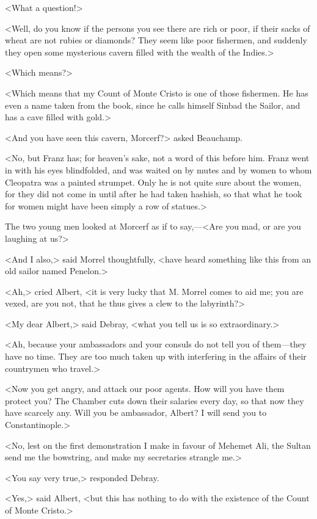  <What a question!> 

 <Well, do you know if the persons you see there are rich or poor, if their sacks of wheat are not rubies or diamonds? They seem like poor fishermen, and suddenly they open some mysterious cavern filled with the wealth of the Indies.> 

 <Which means?> 

 <Which means that my Count of Monte Cristo is one of those fishermen. He has even a name taken from the book, since he calls himself Sinbad the Sailor, and has a cave filled with gold.> 

 <And you have seen this cavern, Morcerf?> asked Beauchamp. 

 <No, but Franz has; for heaven's sake, not a word of this before him. Franz went in with his eyes blindfolded, and was waited on by mutes and by women to whom Cleopatra was a painted strumpet. Only he is not quite sure about the women, for they did not come in until after he had taken hashish, so that what he took for women might have been simply a row of statues.> 

 The two young men looked at Morcerf as if to say,—<Are you mad, or are you laughing at us?> 

 <And I also,> said Morrel thoughtfully, <have heard something like this from an old sailor named Penelon.> 

 <Ah,> cried Albert, <it is very lucky that M. Morrel comes to aid me; you are vexed, are you not, that he thus gives a clew to the labyrinth?> 

 <My dear Albert,> said Debray, <what you tell us is so extraordinary.> 

 <Ah, because your ambassadors and your consuls do not tell you of them—they have no time. They are too much taken up with interfering in the affairs of their countrymen who travel.> 

 <Now you get angry, and attack our poor agents. How will you have them protect you? The Chamber cuts down their salaries every day, so that now they have scarcely any. Will you be ambassador, Albert? I will send you to Constantinople.> 

 <No, lest on the first demonstration I make in favour of Mehemet Ali, the Sultan send me the bowstring, and make my secretaries strangle me.> 

 <You say very true,> responded Debray. 

 <Yes,> said Albert, <but this has nothing to do with the existence of the Count of Monte Cristo.> 

